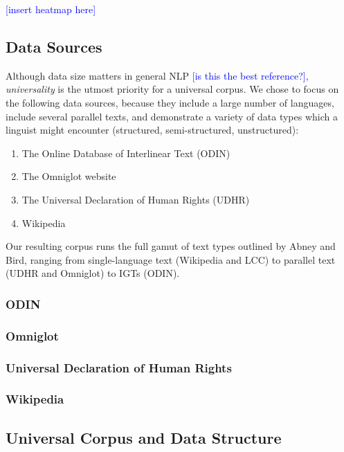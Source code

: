 \textcolor{blue}{[insert heatmap here]}



\subsection{Data Sources} \label{sec:sources}

Although data size matters in general NLP \cite{banko2001scaling} \textcolor{blue}{[is this the best reference?]}, \emph{universality} is the utmost priority for a universal corpus. We chose to focus on the following data sources, because they include a large number of languages, include several parallel texts, and demonstrate a variety of data types which a linguist might encounter (structured, semi-structured, unstructured):

\begin{enumerate}
\item The Online Database of Interlinear Text (ODIN)
\item The Omniglot website
\item The Universal Declaration of Human Rights (UDHR)
\item Wikipedia
\end{enumerate}


Our resulting corpus runs the full gamut of text types outlined by Abney and Bird, ranging from single-language text (Wikipedia and LCC) to parallel text (UDHR and Omniglot) to IGTs (ODIN).



\subsubsection{ODIN}

\subsubsection{Omniglot}

\subsubsection{Universal Declaration of Human Rights}

\subsubsection{Wikipedia}




\subsection{Universal Corpus and Data Structure} \label{sec:structure}

